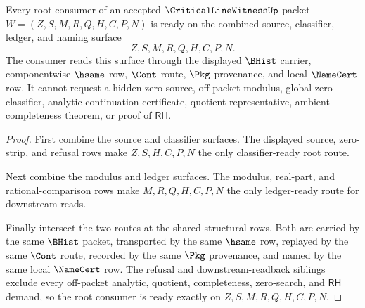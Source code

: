 \begin{theorem}
\label{thm:critical-line-witness-root-consumer-readiness}
Every root consumer of an accepted $\CriticalLineWitnessUp$ packet
$W=(Z,S,M,R,Q,H,C,P,N)$ is ready on the combined source, classifier, ledger,
and naming surface
$$
Z,S,M,R,Q,H,C,P,N .
$$
The consumer reads this surface through the displayed $\BHist$ carrier,
componentwise $\hsame$ row, $\Cont$ route, $\Pkg$ provenance, and local
$\NameCert$ row. It cannot request a hidden zero source, off-packet modulus,
global zero classifier, analytic-continuation certificate, quotient
representative, ambient completeness theorem, or proof of $\mathsf{RH}$.
\end{theorem}
\begin{proof}
First combine the source and classifier surfaces. The displayed source,
zero-strip, and refusal rows make $Z,S,H,C,P,N$ the only classifier-ready root
route.

Next combine the modulus and ledger surfaces. The modulus, real-part, and
rational-comparison rows make $M,R,Q,H,C,P,N$ the only ledger-ready route for
downstream reads.

Finally intersect the two routes at the shared structural rows. Both are
carried by the same $\BHist$ packet, transported by the same $\hsame$ row,
replayed by the same $\Cont$ route, recorded by the same $\Pkg$ provenance,
and named by the same local $\NameCert$ row. The refusal and
downstream-readback siblings exclude every off-packet analytic, quotient,
completeness, zero-search, and $\mathsf{RH}$ demand, so the root consumer is
ready exactly on $Z,S,M,R,Q,H,C,P,N$.
\end{proof}
